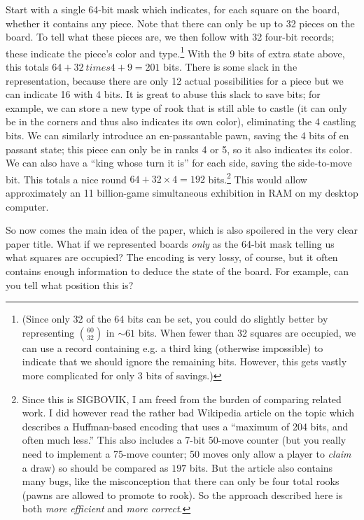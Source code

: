 \documentclass[twocolumn]{amsart}
\begin{document}
Start with a single 64-bit mask which indicates, for each square on
the board, whether it contains any piece. Note that there can only be
up to 32 pieces on the board. To tell what these pieces are, we then
follow with 32 four-bit records; these indicate the piece's color and
type.\footnote{(Since only 32 of the 64 bits can be set, you could do
  slightly better by representing $\binom{60}{32}$ in $\sim 61$ bits.
  When fewer than 32 squares are occupied, we can use a record
  containing e.g. a third king (otherwise impossible) to indicate that
  we should ignore the remaining bits. However, this gets vastly more
  complicated for only 3 bits of savings.)} 
%
With the 9 bits of extra state above, this totals $64+32 \ times 4+9=201$
bits. There is some slack in the representation, because there are
only 12 actual possibilities for a piece but we can indicate 16 with 4
bits. It is great to abuse this slack to save bits; for example, we
can store a new type of rook that is still able to castle (it can only
be in the corners and thus also indicates its own color), eliminating
the 4 castling bits. We can similarly introduce an en-passantable
pawn, saving the 4 bits of en passant state; this piece can only be in
ranks 4 or 5, so it also indicates its color. We can also have a
``king whose turn it is'' for each side, saving the side-to-move bit.
This totals a nice round $64+32 \times 4=192$ bits.\footnote{ Since this is
  SIGBOVIK, I am freed from the burden of comparing related work. I
  did however read the rather bad Wikipedia article on the
  topic\cite{wikipediaboard} which describes a Huffman-based encoding
  that uses a ``maximum of 204 bits, and often much less.'' This also
  includes a 7-bit 50-move counter (but you really need to implement a
  75-move counter; 50 moves only allow a player to {\em claim} a draw)
  so should be compared as $197$ bits. But the article also contains
  many bugs, like the misconception that there can only be four total
  rooks (pawns are allowed to promote to rook). So the approach
  described here is both {\em more efficient} and {\em more correct}.}
%
This would allow approximately an 11 billion-game simultaneous
exhibition in RAM on my desktop computer.

\medskip
So now comes the main idea of the paper, which is also spoilered in the
very clear paper title. What if we represented boards {\em only} as the
64-bit mask telling us what squares are occupied? The encoding is very
lossy, of course, but it often contains enough information to deduce
the state of the board. For example, can you tell what position this is?
\end{document}
